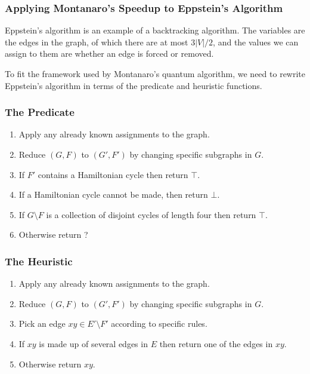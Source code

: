 \documentclass[]{beamer}
\begin{document}
\begin{frame}
\frametitle{Applying Montanaro's Speedup to Eppstein's Algorithm}

Eppstein's algorithm is an example of a backtracking algorithm. The variables are the edges in the graph, of which there are at most $3|V|/2$, and the values we can assign to them are whether an edge is forced or removed.

To fit the framework used by Montanaro's quantum algorithm, we need to rewrite Eppstein's algorithm in terms of the predicate and heuristic functions.
\end{frame}

\begin{frame}
\frametitle{The Predicate}

\begin{enumerate}
\item Apply any already known assignments to the graph.
\item Reduce $(G, F)$ to $(G', F')$ by changing specific subgraphs in $G$.
\item If $F'$ contains a Hamiltonian cycle then return $\top$.
\item If a Hamiltonian cycle cannot be made, then return $\bot$.
\item If $G \setminus F$ is a collection of disjoint cycles of length four then return $\top$.
\item Otherwise return ?
\end{enumerate}
\end{frame}

\begin{frame}
\frametitle{The Heuristic}

\begin{enumerate}
\item Apply any already known assignments to the graph.
\item Reduce $(G, F)$ to $(G', F')$ by changing specific subgraphs in $G$.
\item Pick an edge $xy \in E' \setminus F'$ according to specific rules.
\item If $xy$ is made up of several edges in $E$ then return one of the edges in $xy$.
\item Otherwise return $xy$.
\end{enumerate}
\end{frame}
\end{document}

